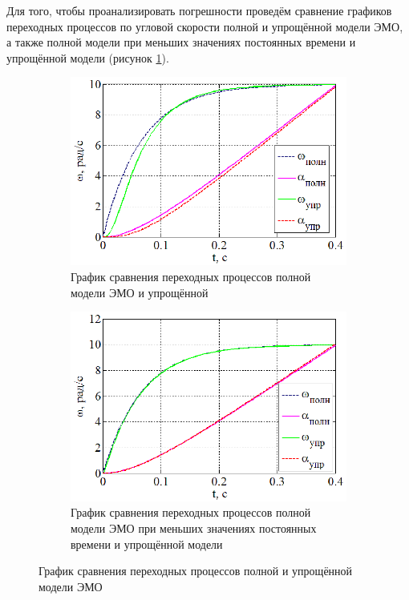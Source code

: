 \documentclass[a4paper,12pt]{article} %
\begin{document}
Для того, чтобы проанализировать погрешности проведём сравнение графиков переходных процессов по угловой скорости полной и упрощённой модели ЭМО, а также полной модели при меньших значениях постоянных времени и упрощённой модели (рисунок \ref{sravnenie}). 
\begin{figure}[H]
	\centering
	\begin{subfigure}[b]{0.48\textwidth}
	    \includegraphics[width = \textwidth]{scheme/SR1}
		\caption{График сравнения переходных процессов полной модели ЭМО и упрощённой}
	\end{subfigure}
	\hfill
	\begin{subfigure}[b]{0.48\textwidth}
		\includegraphics[width = \textwidth]{scheme/SR2}
		
		\caption{График сравнения переходных процессов полной модели ЭМО при меньших значениях постоянных времени и упрощённой модели}
	\end{subfigure}
	\caption{График сравнения переходных процессов полной и упрощённой модели ЭМО}
	\label{sravnenie}
\end{figure}
\end{document}
